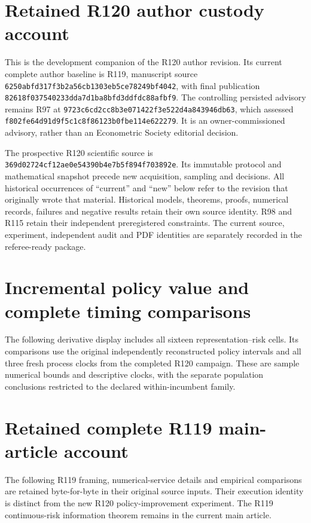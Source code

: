 \documentclass[ecta,nameyear,draft]{econsocart}
\begin{document}
\section{Retained R120 author custody account}\label{dev:custody120}
This is the development companion of the R120 author revision. Its current
complete author baseline is R119, manuscript source
\nolinkurl{6250abfd317f3b2a56cb1303eb5ce78249bf4042}, with final publication
\nolinkurl{82618f037540233dda7d1ba8bfd3ddfdc88afbf9}. The controlling persisted
advisory remains R97 at
\nolinkurl{9723c6cd2cc8b3e071422f3e522d4a843946db63}, which assessed
\nolinkurl{f802fe64d91d9f5c1c8f86123b0fbe114e622279}. It is an owner-commissioned
advisory, rather than an Econometric Society editorial decision.

The prospective R120 scientific source is
\nolinkurl{369d02724cf12ae0e54390b4e7b5f894f703892e}. Its immutable protocol
and mathematical snapshot precede new acquisition, sampling and decisions.
All historical occurrences of ``current'' and ``new'' below refer to the
revision that originally wrote that material. Historical models, theorems,
proofs, numerical records, failures and negative results retain their own
source identity. R98 and R115 retain their independent preregistered constraints.
The current source, experiment, independent audit and PDF identities are
separately recorded in the referee-ready package.


\section{Incremental policy value and complete timing comparisons}
\label{dev:incrementalcomparison120}
The following derivative display includes all sixteen representation--risk
cells. Its comparisons use the original independently reconstructed policy
intervals and all three fresh process clocks from the completed R120 campaign.
These are sample numerical bounds and descriptive clocks, with the separate
population conclusions restricted to the declared within-incumbent family.

\section{Retained complete R119 main-article account}\label{dev:main119}
The following R119 framing, numerical-service details and empirical comparisons
are retained byte-for-byte in their original source inputs. Their execution
identity is distinct from the new R120 policy-improvement experiment. The R119
continuous-risk information theorem remains in the current main article.


















\end{document}
